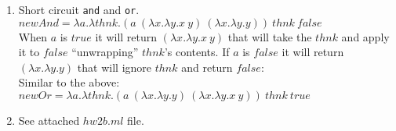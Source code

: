 \documentclass{article}
\begin{document}
\begin{enumerate}
  \item Short circuit \verb|and| and \verb|or|.\\

    $newAnd = \lambda a.\lambda thnk.(a\ (\lambda x.\lambda y.x\ y)\ (\lambda x.\lambda y.y))\ thnk\ false$\\

    When $a$ is $true$ it will return $(\lambda x.\lambda y.x\ y)$ that will take the $thnk$ and apply it to $false$ ``unwrapping'' $thnk$'s contents. If $a$ is $false$ it will return $(\lambda x.\lambda y.y)$ that will ignore $thnk$ and return $false$: \\

    Similar to the above: \\

    $newOr = \lambda a.\lambda thnk.(a\ (\lambda x.\lambda y.y)\ (\lambda x.\lambda y.x\ y))\ thnk\ true$\\

  \item{See attached $hw2b.ml$ file.}
\end{enumerate}
\end{document}
